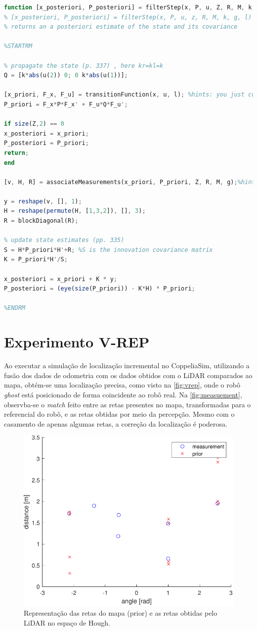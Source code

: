 \begin{lstlisting}[language=Octave]
function [x_posteriori, P_posteriori] = filterStep(x, P, u, Z, R, M, k, g, l)
% [x_posteriori, P_posteriori] = filterStep(x, P, u, z, R, M, k, g, l)
% returns an a posteriori estimate of the state and its covariance

%STARTRM

% propagate the state (p. 337) , here kr=kl=k
Q = [k*abs(u(2)) 0; 0 k*abs(u(1))]; 

[x_priori, F_x, F_u] = transitionFunction(x, u, l); %hints: you just coded this function
P_priori = F_x*P*F_x' + F_u*Q*F_u';

if size(Z,2) == 0
x_posteriori = x_priori;
P_posteriori = P_priori;
return;
end

[v, H, R] = associateMeasurements(x_priori, P_priori, Z, R, M, g);%hints: you just coded this function

y = reshape(v, [], 1);
H = reshape(permute(H, [1,3,2]), [], 3);
R = blockDiagonal(R);

% update state estimates (pp. 335)
S = H*P_priori*H'+R; %S is the innovation covariance matrix
K = P_priori*H'/S;

x_posteriori = x_priori + K * y;
P_posteriori = (eye(size(P_priori)) - K*H) * P_priori;

%ENDRM
\end{lstlisting}

\clearpage

\section{Experimento V-REP}

Ao executar a simulação de localização incremental no CoppeliaSim, utilizando a fusão dos dados de odometria com os dados obtidos com o LiDAR comparados ao mapa, obtém-se uma localização precisa, como visto na \autoref{fig:vrep}, onde o robô \textit{ghost} está posicionado de forma coincidente ao robô real. Na \autoref{fig:measuement}, observba-se o \textit{match} feito entre as retas presentes no mapa, transformadas para o referencial do robô, e as retas obtidas por meio da percepção. Mesmo com o casamento de apenas algumas retas, a correção da localização é poderosa.

\begin{figure}[H]
	\centering
	\includegraphics[width=0.65\linewidth]{img/measuement}
	\caption{Representação das retas do mapa (prior) e as retas obtidas pelo LiDAR no espaço de Hough.}
	\label{fig:measuement}
\end{figure}

